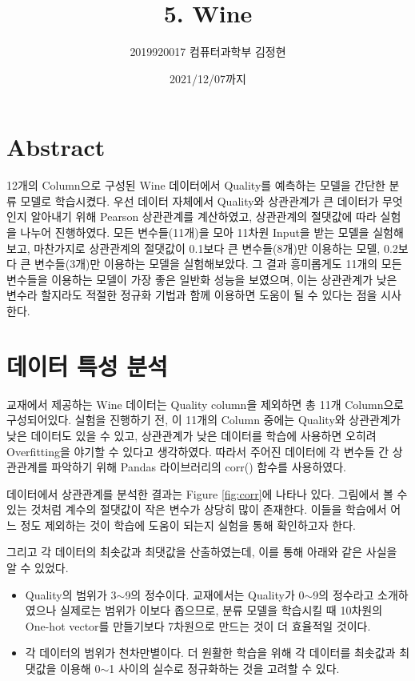\documentclass[letterpaper,10pt]{article}
\begin{document}
	
	\title{5. Wine}
	\author{2019920017 컴퓨터과학부 김정현}
	\date{2021/12/07까지}
	\maketitle
	
	\section{Abstract}
	
	12개의 Column으로 구성된 Wine 데이터에서 Quality를 예측하는 모델을 간단한 분류 모델로 학습시켰다. 우선 데이터 자체에서 Quality와 상관관계가 큰 데이터가 무엇인지 알아내기 위해 Pearson 상관관계를 계산하였고, 상관관계의 절댓값에 따라 실험을 나누어 진행하였다. 모든 변수들(11개)을 모아 11차원 Input을 받는 모델을 실험해보고, 마찬가지로 상관관계의 절댓값이 0.1보다 큰 변수들(8개)만 이용하는 모델, 0.2보다 큰 변수들(3개)만 이용하는 모델을 실험해보았다. 그 결과 흥미롭게도 11개의 모든 변수들을 이용하는 모델이 가장 좋은 일반화 성능을 보였으며, 이는 상관관계가 낮은 변수라 할지라도 적절한 정규화 기법과 함께 이용하면 도움이 될 수 있다는 점을 시사한다.
	
	\section{데이터 특성 분석}
	
	교재에서 제공하는 Wine 데이터는 Quality column을 제외하면 총 11개 Column으로 구성되어있다. 실험을 진행하기 전, 이 11개의 Column 중에는 Quality와 상관관계가 낮은 데이터도 있을 수 있고, 상관관계가 낮은 데이터를 학습에 사용하면 오히려 Overfitting을 야기할 수 있다고 생각하였다. 따라서 주어진 데이터에 각 변수들 간 상관관계를 파악하기 위해 Pandas 라이브러리의 corr() 함수를 사용하였다.
	
	데이터에서 상관관계를 분석한 결과는 Figure \ref{fig:corr}에 나타나 있다. 그림에서 볼 수 있는 것처럼 계수의 절댓값이 작은 변수가 상당히 많이 존재한다. 이들을 학습에서 어느 정도 제외하는 것이 학습에 도움이 되는지 실험을 통해 확인하고자 한다.
	
	그리고 각 데이터의 최솟값과 최댓값을 산출하였는데, 이를 통해 아래와 같은 사실을 알 수 있었다.
	
	\begin{itemize}
		\item Quality의 범위가 3$\sim$9의 정수이다. 교재에서는 Quality가 0$\sim$9의 정수라고 소개하였으나 실제로는 범위가 이보다 좁으므로, 분류 모델을 학습시킬 때 10차원의 One-hot vector를 만들기보다 7차원으로 만드는 것이 더 효율적일 것이다.
		\item 각 데이터의 범위가 천차만별이다. 더 원활한 학습을 위해 각 데이터를 최솟값과 최댓값을 이용해 0$\sim$1 사이의 실수로 정규화하는 것을 고려할 수 있다.
	\end{itemize}
	
\end{document}
